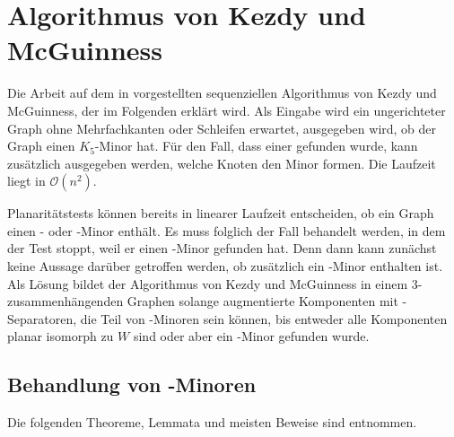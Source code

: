 \chapter{Algorithmus von Kezdy und McGuinness}
\label{cha:algorithmuskezdymcguinness}

Die Arbeit auf dem in \cite{KeM92} vorgestellten sequenziellen Algorithmus von Kezdy und McGuinness, der im Folgenden erklärt wird.
Als Eingabe wird ein ungerichteter Graph ohne Mehrfachkanten oder Schleifen erwartet, ausgegeben wird, ob der Graph einen $K_5$-Minor hat.
Für den Fall, dass einer gefunden wurde, kann zusätzlich ausgegeben werden, welche Knoten den Minor formen.
Die Laufzeit liegt in $\mathcal{O}(n^2)$. %

Planaritätstests können bereits in linearer Laufzeit entscheiden, ob ein Graph einen \kf- oder \kdd-Minor enthält\cite{BoM04}.
Es muss folglich der Fall behandelt werden, in dem der Test stoppt, weil er einen \kdd-Minor gefunden hat.
Denn dann kann zunächst keine Aussage darüber getroffen werden, ob zusätzlich ein \kf-Minor enthalten ist.
Als Lösung bildet der Algorithmus von Kezdy und McGuinness in einem $3$-zusammenhängenden Graphen solange augmentierte Komponenten mit \dd-Separatoren, die Teil von \kdd-Minoren sein können, bis entweder alle Komponenten planar \bzw isomorph zu $W$ sind oder aber ein \kf-Minor gefunden wurde.


\section{Behandlung von \kdd-Minoren}
\label{sec:behandlung_von_kdd_minoren}

Die folgenden Theoreme, Lemmata und meisten Beweise sind \cite{KeM92} entnommen.

